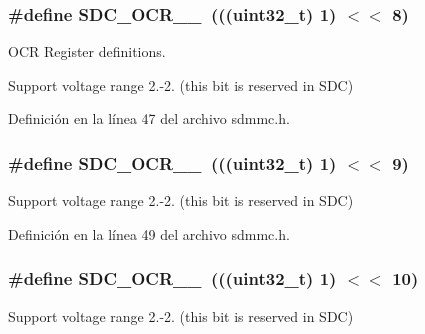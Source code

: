 \subsubsection[{\texorpdfstring{S\+D\+C\+\_\+\+O\+C\+R\+\_\+20\+\_\+21}{SDC_OCR_20_21}}]{\setlength{\rightskip}{0pt plus 5cm}\#define S\+D\+C\+\_\+\+O\+C\+R\+\_\+\_~(((uint32\+\_\+t) 1) $<$$<$ 8)}\hypertarget{group___c_h_i_p___s_d_m_m_c___definitions_ga22f9a95fb2cb0b0442a8e15e85c02309}{}\label{group___c_h_i_p___s_d_m_m_c___definitions_ga22f9a95fb2cb0b0442a8e15e85c02309}


O\+CR Register definitions. 

Support voltage range 2.-\/2. (this bit is reserved in S\+DC) 

Definición en la línea 47 del archivo sdmmc.\+h.

\subsubsection[{\texorpdfstring{S\+D\+C\+\_\+\+O\+C\+R\+\_\+21\+\_\+22}{SDC_OCR_21_22}}]{\setlength{\rightskip}{0pt plus 5cm}\#define S\+D\+C\+\_\+\+O\+C\+R\+\_\+\_~(((uint32\+\_\+t) 1) $<$$<$ 9)}\hypertarget{group___c_h_i_p___s_d_m_m_c___definitions_ga4859335686cfb475044c3f295e22ad41}{}\label{group___c_h_i_p___s_d_m_m_c___definitions_ga4859335686cfb475044c3f295e22ad41}
Support voltage range 2.-\/2. (this bit is reserved in S\+DC) 

Definición en la línea 49 del archivo sdmmc.\+h.

\subsubsection[{\texorpdfstring{S\+D\+C\+\_\+\+O\+C\+R\+\_\+22\+\_\+23}{SDC_OCR_22_23}}]{\setlength{\rightskip}{0pt plus 5cm}\#define S\+D\+C\+\_\+\+O\+C\+R\+\_\+\_~(((uint32\+\_\+t) 1) $<$$<$ 10)}\hypertarget{group___c_h_i_p___s_d_m_m_c___definitions_ga89420303e5206b28f7f7fe9d712682dc}{}\label{group___c_h_i_p___s_d_m_m_c___definitions_ga89420303e5206b28f7f7fe9d712682dc}
Support voltage range 2.-\/2. (this bit is reserved in S\+DC) 

